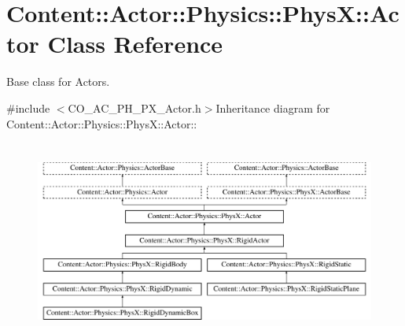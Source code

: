 \hypertarget{classContent_1_1Actor_1_1Physics_1_1PhysX_1_1Actor}{
\section{Content::Actor::Physics::PhysX::Actor Class Reference}
\label{classContent_1_1Actor_1_1Physics_1_1PhysX_1_1Actor}
}


Base class for Actors.  


{\ttfamily \#include $<$CO\_\-AC\_\-PH\_\-PX\_\-Actor.h$>$}Inheritance diagram for Content::Actor::Physics::PhysX::Actor::\begin{figure}[H]
\begin{center}
\leavevmode
\includegraphics[height=6.59933cm]{classContent_1_1Actor_1_1Physics_1_1PhysX_1_1Actor}
\end{center}
\end{figure}
